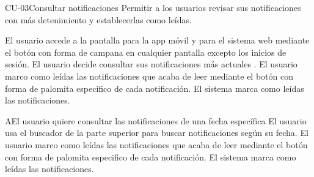 
\begin{UseCase}{CU-03}{Consultar notificaciones}{
    Permitir a los usuarios revisar sus notificaciones con más detenimiento y establecerlas como leídas.
}

\end{UseCase}

\begin{UCtrayectoria}
    \UCpaso[\UCactor] El usuario accede a la pantalla \label{CU03.introduceDatos} para la app móvil y  para el sistema web mediante el botón con forma de campana en cualquier pantalla excepto los inicios de sesión.
    \UCpaso[\UCactor] El usuario decide consultar sus notificaciones más actuales .
    \UCpaso[\UCactor] El usuario marco como leídas las notificaciones que acaba de leer mediante el botón con forma de palomita especifico de cada notificación.
    \UCpaso El sistema marca como leídas las notificaciones.

\end{UCtrayectoria}

\begin{UCtrayectoriaA}{A}{El usuario quiere consultar las notificaciones de una fecha específica}
	\UCpaso[\UCactor] El usuario usa el buscador de la parte superior para buscar notificaciones según su fecha.
	\UCpaso[\UCactor] El usuario marco como leídas las notificaciones que acaba de leer mediante el botón con forma de palomita especifico de cada notificación.
	\UCpaso El sistema marca como leídas las notificaciones.

\end{UCtrayectoriaA}


